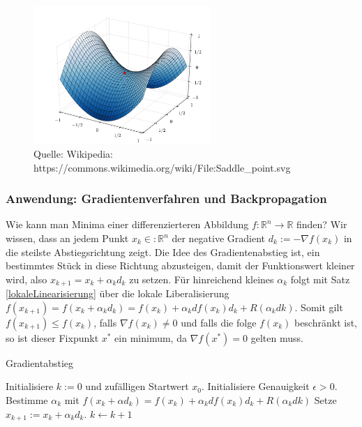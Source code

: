 \begin{figure}[H]
      \centering
    \includegraphics[width=0.6\textwidth]{images/Saddle_point}
      \caption{Quelle: Wikipedia: https://commons.wikimedia.org/wiki/File:Saddle\_point.svg}

\end{figure}



\subsubsection*{Anwendung: Gradientenverfahren und Backpropagation} 
Wie kann man Minima einer  differenzierteren Abbildung $f: \mathbb{R}^n \to \mathbb{R}$ finden? 
Wir wissen, dass an jedem Punkt $x_k \in : \mathbb{R}^n$ der negative Gradient  $d_k := -\nabla f (x_k)$ in die steilste Abstiegsrichtung zeigt.
Die Idee des Gradientenabstieg ist, ein bestimmtes  Stück in diese Richtung abzusteigen, damit der Funktionswert kleiner wird, also $x_{k+1} = x_k + \alpha_k d_k$ zu setzen. Für hinreichend kleines $\alpha_k$ folgt mit Satz \ref{lokaleLinearisierung} über die lokale Liberalisierung  
$f(x_{k+1}) = f (x_k + \alpha_k d_k) =  f(x_k) + \alpha_k df(x_k)d_k + R( \alpha_k dk)$.  Somit gilt $f(x_{k+1}) \leq f(x_k)$, falls $\nabla f(x_k) \neq 0$ und falls die folge $f(x_k)$ beschränkt ist, so ist  dieser Fixpunkt $x^*$ ein minimum, da $\nabla f(x^*) = 0$ gelten muss.  

\begin{algorithm}
\caption{Gradientabstieg}
\begin{algorithmic}[1]


    \State Initialisiere $k:=0$ und zufälligen Startwert $x_0$.
\State Initialisiere Genauigkeit $\epsilon > 0$.
      
        \State Bestimme $\alpha_k$  mit $f (x_k + \alpha d_k) =  f(x_k) + \alpha_k df(x_k)d_k + R( \alpha_k dk)$ 
        \State Setze $x_{k+1} := x_k  + \alpha_k d_k$. 
 	\State  $k \leftarrow k+1$ 
    \EndWhile  \label{roy's loop}


\end{algorithmic}
\end{algorithm}

